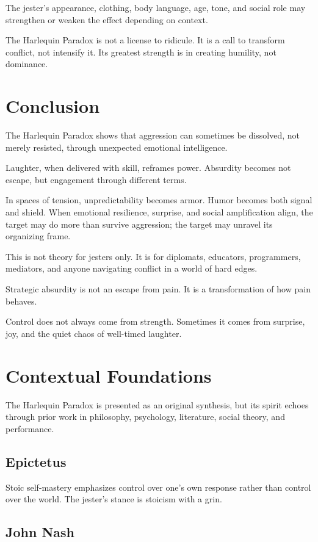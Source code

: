 \documentclass[11pt]{article}
\begin{document}
The jester's appearance, clothing, body language, age, tone, and social role may strengthen or weaken the effect depending on context.

The Harlequin Paradox is not a license to ridicule. It is a call to transform conflict, not intensify it. Its greatest strength is in creating humility, not dominance.

\section{Conclusion}

The Harlequin Paradox shows that aggression can sometimes be dissolved, not merely resisted, through unexpected emotional intelligence.

Laughter, when delivered with skill, reframes power. Absurdity becomes not escape, but engagement through different terms.

In spaces of tension, unpredictability becomes armor. Humor becomes both signal and shield. When emotional resilience, surprise, and social amplification align, the target may do more than survive aggression; the target may unravel its organizing frame.

This is not theory for jesters only. It is for diplomats, educators, programmers, mediators, and anyone navigating conflict in a world of hard edges.

Strategic absurdity is not an escape from pain. It is a transformation of how pain behaves.

Control does not always come from strength. Sometimes it comes from surprise, joy, and the quiet chaos of well-timed laughter.

\section{Contextual Foundations}

The Harlequin Paradox is presented as an original synthesis, but its spirit echoes through prior work in philosophy, psychology, literature, social theory, and performance.

\subsection{Epictetus}

Stoic self-mastery emphasizes control over one's own response rather than control over the world. The jester's stance is stoicism with a grin.

\subsection{John Nash}
\end{document}
